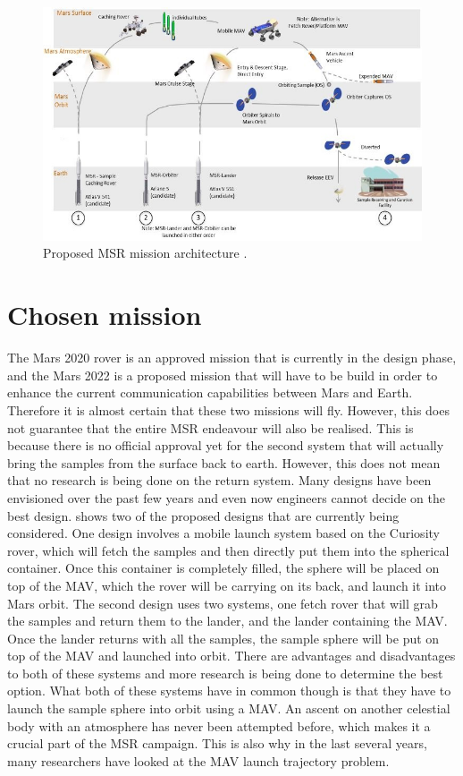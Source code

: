 \begin{figure}[H]
\centering
\includegraphics[width=0.75 \textwidth]{figures/heritage/proposedMSRmissionArchitecture_vaughan2016technology.jpg}
\caption{Proposed \ac{MSR} mission architecture \citep{vaughan2016technology}.}
\label{fig:proposedMSRmissionArchitecture_vaughan2016technology}
\end{figure}




\section{Chosen mission}
\label{sec:chosenMission}
The Mars 2020 rover is an approved mission that is currently in the design phase, and the Mars 2022 is a proposed mission that will have to be build in order to enhance the current communication capabilities between Mars and Earth. Therefore it is almost certain that these two missions will fly. However, this does not guarantee that the entire \ac{MSR} endeavour will also be realised. This is because there is no official approval yet for the second system that will actually bring the samples from the surface back to earth. However, this does not mean that no research is being done on the return system. Many designs have been envisioned over the past few years and even now engineers cannot decide on the best design. \cite{shotwell2016drivers} shows two of the proposed designs that are currently being considered. One design involves a mobile launch system based on the Curiosity rover, which will fetch the samples and then directly put them into the spherical container. Once this container is completely filled, the sphere will be placed on top of the \ac{MAV}, which the rover will be carrying on its back, and launch it into Mars orbit. The second design uses two systems, one fetch rover that will grab the samples and return them to the lander, and the lander containing the \ac{MAV}. Once the lander returns with all the samples, the sample sphere will be put on top of the \ac{MAV} and launched into orbit. There are advantages and disadvantages to both of these systems and more research is being done to determine the best option. What both of these systems have in common though is that they have to launch the sample sphere into orbit using a \ac{MAV}. An ascent on another celestial body with an atmosphere has never been attempted before, which makes it a crucial part of the \ac{MSR} campaign. This is also why in the last several years, many researchers have looked at the \ac{MAV} launch trajectory problem. 

